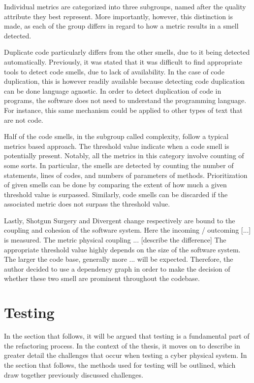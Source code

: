 Individual metrics are categorized into three subgroups, named after the quality attribute they best represent. More importantly, however, this distinction is made, as each of the group differs in regard to how a metric results in a smell detected. 

Duplicate code particularly differs from the other smells, due to it being detected automatically. Previously, it was stated that it was difficult to find appropriate tools to detect code smells, due to lack of availability.
In the case of code duplication, this is however readily available because detecting code duplication can be done language agnostic. In order to detect duplication of code in programs, the software does not need to understand the programming language. For instance, this same mechanism could be applied to other types of text that are not code.

Half of the code smells, in the subgroup called complexity, follow a typical metrics based approach. The threshold value indicate when a code smell is potentially present. Notably, all the metrics in this category involve counting of some sorts. In particular, the smells are detected by counting the number of statements, lines of codes, and numbers of parameters of methods. Prioritization of given smells can be done by comparing the extent of how much a given threshold value is surpassed. Similarly, code smells can be discarded if the associated metric does not surpass the threshold value. 


Lastly, Shotgun Surgery and Divergent change respectively are bound to the coupling and cohesion of the software system. Here the incoming / outcoming [...] is measured. The metric physical coupling ...
[describe the difference]
The appropriate threshold value highly depends on the size of the software system. The larger the code base, generally more ... will be expected. Therefore, the author decided to use a dependency graph in order to make the decision of whether these two smell are prominent throughout the codebase. 


\section{Testing}
In the section that follows, it will be argued that testing is a fundamental part of the refactoring process. In the context of the thesis, it moves on to describe in greater detail the challenges that occur when testing a cyber physical system. In the section that follows, the methods used for testing 
will be outlined, which draw together previously discussed challenges.

